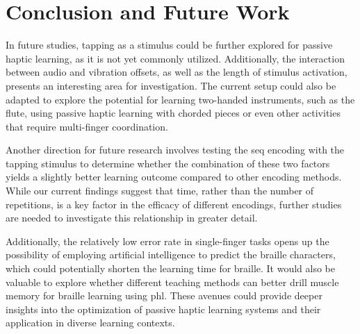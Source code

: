 \chapter{Conclusion and Future Work}
\label{ch:conclusion}


In future studies, tapping as a stimulus could be further explored for passive haptic learning, as it is not yet commonly utilized. Additionally, the interaction between audio and vibration offsets, as well as the length of stimulus activation, presents an interesting area for investigation. The current setup could also be adapted to explore the potential for learning two-handed instruments, such as the flute, using passive haptic learning with chorded pieces or even other activities that require multi-finger coordination.

Another direction for future research involves testing the \gls{seq} encoding with the tapping stimulus to determine whether the combination of these two factors yields a slightly better learning outcome compared to other encoding methods. While our current findings suggest that time, rather than the number of repetitions, is a key factor in the efficacy of different encodings, further studies are needed to investigate this relationship in greater detail.

Additionally, the relatively low error rate in single-finger tasks opens up the possibility of employing artificial intelligence to predict the braille characters, which could potentially shorten the learning time for braille. It would also be valuable to explore whether different teaching methods can better drill muscle memory for braille learning using \gls{phl}. These avenues could provide deeper insights into the optimization of passive haptic learning systems and their application in diverse learning contexts.

